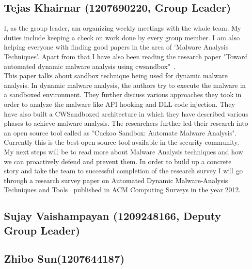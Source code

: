 \documentclass[11pt]{article}
\begin{document}
\subsection{Tejas Khairnar (1207690220, Group Leader)}
I, as the group leader, am organizing weekly meetings with the whole team. My duties include keeping a check on work done by every group member.
I am also helping everyone with finding good papers in the area of 'Malware Analysis Techniques'. Apart from that I have also been reading the research paper "Toward automated dynamic malware analysis using cwsandbox"~\cite{willems2007toward}. \\
This paper talks about sandbox technique being used for dynamic malware analysis. In dynamic malware analysis, the authors try to execute the malware in a sandboxed environment. They further discuss various approaches they took in order to analyze the malware like API hooking and DLL code injection. They have also built a CWSandboxed architecture in which they have described various phases to achieve malware analysis. The researchers further led their research into an open source tool called as "Cuckoo Sandbox: Automate Malware Analysis". Currently this is the best open source tool available in the security community.\\
My next steps will be to read more about Malware Analysis techniques and how we can proactively defend and prevent them. In order to build up a concrete story and take the team to successful completion of the research survey I will go through a research survey paper on Automated Dynamic Malware-Analysis Techniques and Tools~\cite{egele2012survey} published in ACM Computing Surveys in the year 2012. 		
\subsection{Sujay Vaishampayan (1209248166, Deputy Group Leader)}
		

\subsection{Zhibo Sun(1207644187)}
\end{document}

